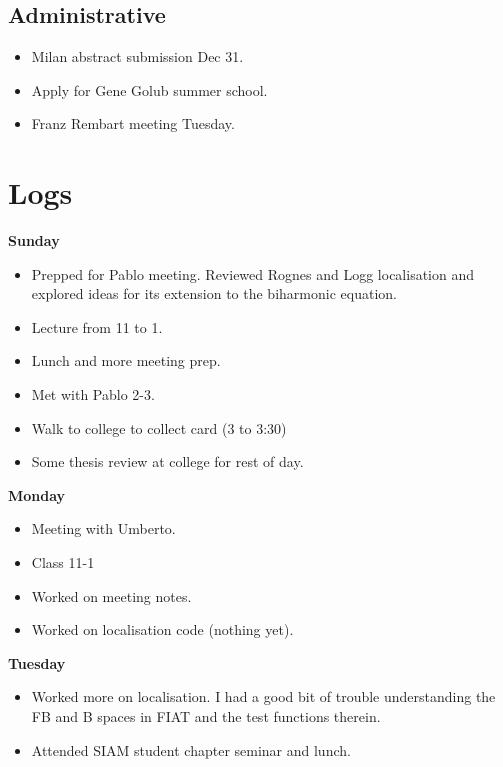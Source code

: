 \documentclass[12pt,a4paper]{article}
\begin{document}
\subsection{Administrative}

\begin{itemize}
    \item Milan abstract submission Dec 31.
    \item  Apply for Gene Golub summer school.
    \item  Franz Rembart meeting Tuesday.
\end{itemize}


\newpage
\section{Logs}


\textbf{Sunday}

\begin{itemize}
    \item Prepped for Pablo meeting. Reviewed Rognes and Logg localisation and explored ideas for its extension to the biharmonic equation.
    \item Lecture from 11 to 1. 
    \item Lunch and more meeting prep.
    \item Met with Pablo 2-3.
    \item Walk to college to collect card (3 to 3:30)
    \item Some thesis review at college for rest of day.
\end{itemize}


\textbf{Monday}

\begin{itemize}
    \item Meeting with Umberto.
    \item Class 11-1
    \item Worked on meeting notes.
    \item Worked on localisation code (nothing yet).
\end{itemize}

\textbf{Tuesday}

\begin{itemize}
    \item Worked more on localisation. I had a good bit of trouble understanding the FB and B spaces in FIAT and the test functions therein. 
    \item Attended SIAM student chapter seminar and lunch.
\end{itemize}
\end{document}
